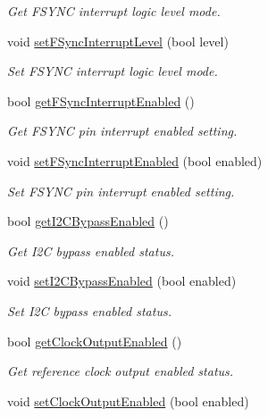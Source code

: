 \begin{DoxyCompactItemize}
\begin{DoxyCompactList}\small\item\em Get F\+S\+Y\+NC interrupt logic level mode. \end{DoxyCompactList}\item 
void \mbox{\hyperlink{classMPU6050_a2b1c75cfc29e8ff8205f4ff33a426716}{set\+F\+Sync\+Interrupt\+Level}} (bool level)
\begin{DoxyCompactList}\small\item\em Set F\+S\+Y\+NC interrupt logic level mode. \end{DoxyCompactList}\item 
bool \mbox{\hyperlink{classMPU6050_a4c01f9ab83b64dbbc6b62e658c3d3d9b}{get\+F\+Sync\+Interrupt\+Enabled}} ()
\begin{DoxyCompactList}\small\item\em Get F\+S\+Y\+NC pin interrupt enabled setting. \end{DoxyCompactList}\item 
void \mbox{\hyperlink{classMPU6050_a96aa409e02cdb7d3671890c70b44f167}{set\+F\+Sync\+Interrupt\+Enabled}} (bool enabled)
\begin{DoxyCompactList}\small\item\em Set F\+S\+Y\+NC pin interrupt enabled setting. \end{DoxyCompactList}\item 
bool \mbox{\hyperlink{classMPU6050_aed33db318a770d0020eb8b84058650f3}{get\+I2\+C\+Bypass\+Enabled}} ()
\begin{DoxyCompactList}\small\item\em Get I2C bypass enabled status. \end{DoxyCompactList}\item 
void \mbox{\hyperlink{classMPU6050_aa828160756a50f414aa3f5f5f0353c70}{set\+I2\+C\+Bypass\+Enabled}} (bool enabled)
\begin{DoxyCompactList}\small\item\em Set I2C bypass enabled status. \end{DoxyCompactList}\item 
bool \mbox{\hyperlink{classMPU6050_ada96c33957bf20c04ca598a3537358ef}{get\+Clock\+Output\+Enabled}} ()
\begin{DoxyCompactList}\small\item\em Get reference clock output enabled status. \end{DoxyCompactList}\item 
void \mbox{\hyperlink{classMPU6050_a71ec4642b6f6c937bbf6a24fea4179e5}{set\+Clock\+Output\+Enabled}} (bool enabled)

\end{DoxyCompactItemize}
